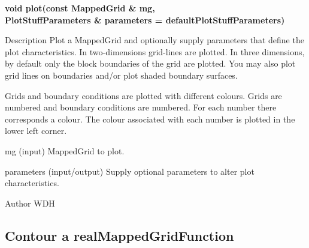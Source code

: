 \begin{flushleft} \textbf{%
\settowidth{\argIndent}{void plot(}%
void plot(const MappedGrid \& mg, \\ 
\hspace{\argIndent}      PlotStuffParameters \& parameters  = defaultPlotStuffParameters)
}\end{flushleft}
\begin{Lentry}
\item[Description] 
   Plot a MappedGrid and optionally supply parameters that define the plot characteristics.
   In two-dimensions grid-lines are plotted. 
   In three dimensions, by default only the block boundaries of the grid are plotted.
   You may also plot grid lines on boundaries and/or plot shaded boundary surfaces.

   Grids and boundary conditions are plotted with different colours. Grids are numbered
   and boundary conditions are numbered. For each number there corresponds a colour.
   The colour associated with each number is plotted in the lower left corner.
 

\item[mg (input)]  MappedGrid to plot.
\item[parameters (input/output)]  Supply optional parameters to alter plot characteristics.

\item[Author]  WDH

\end{Lentry}
\subsection{Contour a realMappedGridFunction}
 
